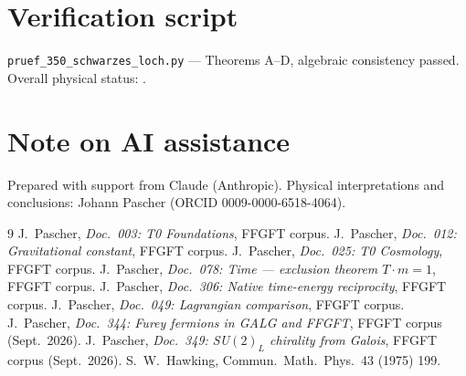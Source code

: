 \section*{Verification script}
\texttt{pruef\_350\_schwarzes\_loch.py} --- Theorems A--D, algebraic
consistency passed. Overall physical status: \SM.

\section*{Note on AI assistance}
Prepared with support from Claude (Anthropic).
Physical interpretations and conclusions: Johann Pascher (ORCID 0009-0000-6518-4064).

\begin{thebibliography}{9}
 J.~Pascher, \textit{Doc.~003: T0 Foundations}, FFGFT corpus.
 J.~Pascher, \textit{Doc.~012: Gravitational constant}, FFGFT corpus.
 J.~Pascher, \textit{Doc.~025: T0 Cosmology}, FFGFT corpus.
 J.~Pascher, \textit{Doc.~078: Time --- exclusion theorem $T\cdot m=1$}, FFGFT corpus.
 J.~Pascher, \textit{Doc.~306: Native time-energy reciprocity}, FFGFT corpus.
 J.~Pascher, \textit{Doc.~049: Lagrangian comparison}, FFGFT corpus.
 J.~Pascher, \textit{Doc.~344: Furey fermions in GALG and FFGFT}, FFGFT corpus (Sept.\ 2026).
 J.~Pascher, \textit{Doc.~349: SU$(2)_L$ chirality from Galois}, FFGFT corpus (Sept.\ 2026).
 S.~W.~Hawking, Commun.\ Math.\ Phys.\ 43 (1975) 199.
\end{thebibliography}
